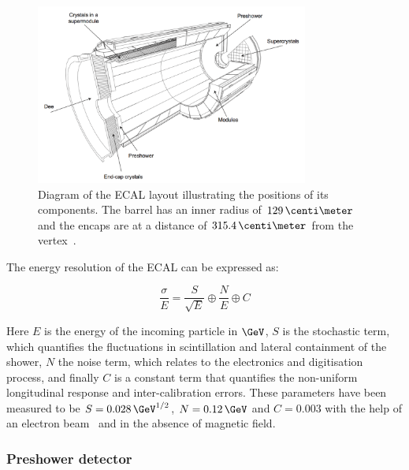 \begin{figure}[!htb]
  \centering
  \includegraphics[width=0.8\textwidth]{Chapter02/CMS/Images/CMS_ECAL_Layout.png}
  \caption[Diagram of the ECAL layout illustrating the positions of its components.]
  {Diagram of the ECAL layout illustrating the positions of its components. The barrel has an inner radius of $129\,\centi\meter$ and the encaps are at a distance of $315.4\,\centi\meter$ from the vertex~\cite{ARTICLE:TheCMSExperiment}.}
  \label{FIGURE:ExperimentalApparatus_CMS_ECAL_Layout}
\end{figure}
 
The energy resolution of the \gls{ECAL} can be expressed as: 

\begin{equation}
\frac{\sigma}{E} = \frac{S}{\sqrt{E}} \oplus \frac{N}{E} \oplus C
\end{equation}

Here $E$ is the energy of the incoming particle in $\GeV$, $S$ is the stochastic term, which quantifies the fluctuations in scintillation and lateral containment of the shower, $N$ the noise term, which relates to the electronics and digitisation process, and finally $C$ is a constant term that quantifies the non-uniform longitudinal response and inter-calibration errors. These parameters have been measured to be  $S=0.028\,\GeV^{1/2}$, $N=0.12\,\GeV$ and $C=0.003$ with the help of an electron beam~\cite{ARTICLE:CMSECALTestBeam} and in the absence of magnetic field.

\subsubsection{Preshower detector}
\label{SUBSUBSECTION:ExperimentalApparatus_CMS_ECAL_Preshower}

